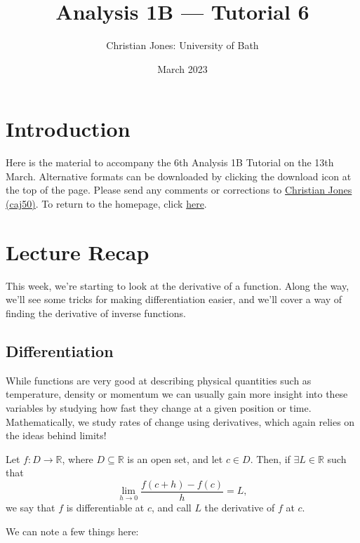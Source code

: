 \documentclass[
  12pt,
  a4paper]{extarticle}
\title{Analysis 1B --- Tutorial 6}
\author{Christian Jones: University of Bath}
\date{March 2023}
\theoremstyle{plain}
\theoremstyle{definition}
\theoremstyle{plain}
\theoremstyle{plain}
\theoremstyle{plain}
\theoremstyle{plain}
\theoremstyle{definition}
\theoremstyle{definition}
\theoremstyle{remark}
\theoremstyle{remark}
\let\BeginKnitrBlock\begin \let\EndKnitrBlock\end
\renewcommand{\;}{\,}
\begin{document}
\maketitle

{
\setcounter{tocdepth}{2}
\tableofcontents
}
\newpage
{}

\hypertarget{introduction}{%
\section*{Introduction}\label{introduction}}

Here is the material to accompany the 6th Analysis 1B Tutorial on the 13th March. Alternative formats can be downloaded by clicking the download icon at the top of the page. Please send any comments or corrections to \href{mailto:caj50@bath.ac.uk}{Christian Jones (caj50)}. To return to the homepage, click \href{http://caj50.github.io/tutoring.html}{here}.

\hypertarget{lecture-recap}{%
\section{Lecture Recap}\label{lecture-recap}}

This week, we're starting to look at the derivative of a function. Along the way, we'll see some tricks for making differentiation easier, and we'll cover a way of finding the derivative of inverse functions.

\hypertarget{differentiation}{%
\subsection{Differentiation}\label{differentiation}}

While functions are very good at describing physical quantities such as temperature, density or momentum we can usually gain more insight into these variables by studying how fast they change at a given position or time. Mathematically, we study rates of change using derivatives, which again relies on the ideas behind limits!

\BeginKnitrBlock{definition}[Derivative]
{\label{def:def1} }Let \(f: D \to \mathbb{R}\), where \(D \subseteq \mathbb{R}\) is an open set, and let \(c \in D\). Then, if \(\exists L \in \mathbb{R}\) such that \[\lim_{h \to 0}\frac{f(c+h) - f(c)}{h} = L,\] we say that \(f\) is differentiable at \(c\), and call \(L\) the derivative of \(f\) at \(c\).
\EndKnitrBlock{definition}
We can note a few things here:
\end{document}
